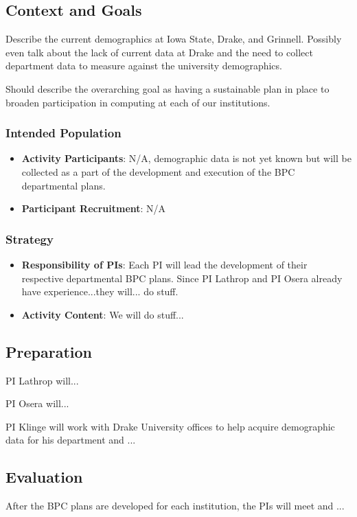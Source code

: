 \documentclass[11pt]{article}
\begin{document}
\subsection{Context and Goals}
Describe the current demographics at Iowa State, Drake, and Grinnell.
Possibly even talk about the lack of current data at Drake and the need to collect department data to measure against the university demographics.

Should describe the overarching goal as having a sustainable plan in place to broaden participation in computing at each of our institutions.

\subsubsection{Intended Population}
\begin{itemize}
	\item 
	\textbf{Activity Participants}: N/A, demographic data is not yet known but will be collected as a part of the development and execution of the BPC departmental plans.
	
	\item 
	\textbf{Participant Recruitment}: N/A
\end{itemize}

\subsubsection{Strategy}

\begin{itemize}
	\item 
	\textbf{Responsibility of PIs}: Each PI will lead the development of their respective departmental BPC plans.
	Since PI Lathrop and PI Osera already have experience...they will... do stuff.
	
	\item 
	\textbf{Activity Content}:
	We will do stuff...
\end{itemize}

\subsection{Preparation}
PI Lathrop will...

PI Osera will...

PI Klinge will work with Drake University offices to help acquire demographic data for his department and ...

\subsection{Evaluation}
After the BPC plans are developed for each institution, the PIs will meet and ...
\end{document}
